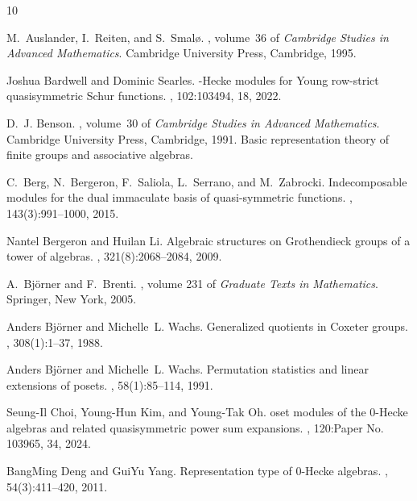 \documentclass[12pt, reqno]{amsart}
\theoremstyle{definition}
\numberwithin{equation}{section} \numberwithin{figure}{section}
\numberwithin{table}{section}
\begin{document}

\begin{thebibliography}{10}

M.~Auslander, I.~Reiten, and S.~Smal\o.
, volume~36 of {\em
  Cambridge Studies in Advanced Mathematics}.
\newblock Cambridge University Press, Cambridge, 1995.

Joshua Bardwell and Dominic Searles.
-{H}ecke modules for {Y}oung row-strict quasisymmetric {S}chur
  functions.
, 102:103494, 18, 2022.

D.~J. Benson.
, volume~30 of {\em
  Cambridge Studies in Advanced Mathematics}.
\newblock Cambridge University Press, Cambridge, 1991.
\newblock Basic representation theory of finite groups and associative
  algebras.

C.~Berg, N.~Bergeron, F.~Saliola, L.~Serrano, and M.~Zabrocki.
\newblock Indecomposable modules for the dual immaculate basis of
  quasi-symmetric functions.
, 143(3):991--1000, 2015.

Nantel Bergeron and Huilan Li.
\newblock Algebraic structures on {G}rothendieck groups of a tower of algebras.
, 321(8):2068--2084, 2009.

A.~Bj\"{o}rner and F.~Brenti.
, volume 231 of {\em Graduate
  Texts in Mathematics}.
\newblock Springer, New York, 2005.

Anders Bj\"{o}rner and Michelle~L. Wachs.
\newblock Generalized quotients in {C}oxeter groups.
, 308(1):1--37, 1988.

Anders Bj\"{o}rner and Michelle~L. Wachs.
\newblock Permutation statistics and linear extensions of posets.
, 58(1):85--114, 1991.

Seung-Il Choi, Young-Hun Kim, and Young-Tak Oh.
oset modules of the 0-{H}ecke algebras and related quasisymmetric
  power sum expansions.
, 120:Paper No. 103965, 34, 2024.

BangMing Deng and GuiYu Yang.
\newblock Representation type of 0-{H}ecke algebras.
, 54(3):411--420, 2011.


\end{thebibliography}
\end{document}

